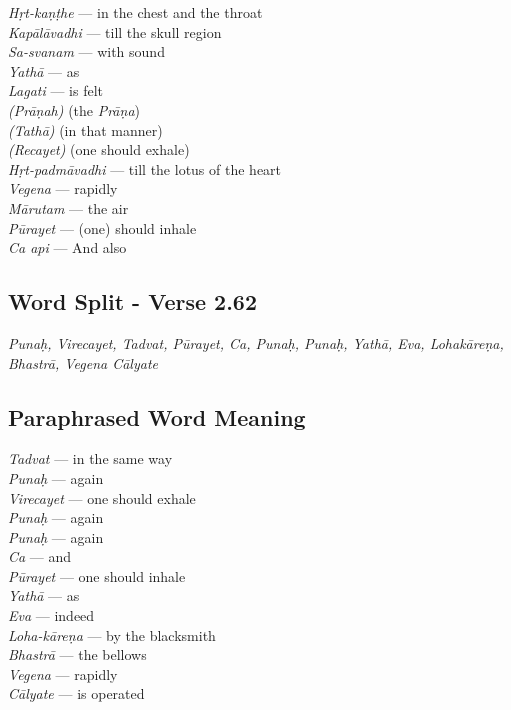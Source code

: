 \begin{multicols}{2}
\textit{Hṛt-kaṇṭhe} --- in the chest and the throat\\
\textit{Kapālāvadhi} --- till the skull  region\\
\textit{Sa-svanam} --- with sound \\
\textit{Yathā} --- as \\
\textit{Lagati} --- is felt \\
\textit{(Prāṇah)}  (the \textit{Prāṇa})\\
\textit{(Tathā)} (in that manner)\\
\textit{(Recayet)} (one should exhale)\\
\textit{Hṛt-padmāvadhi} --- till the lotus of the heart  \\
\textit{Vegena} --- rapidly \\
\textit{Mārutam} --- the air\\ 
\textit{Pūrayet} --- (one) should inhale \\
\textit{Ca api} --- And also 
\end{multicols}

\subsection*{Word Split - Verse 2.62}


\textit{Punaḥ, Virecayet, Tadvat, Pūrayet, Ca, Punaḥ, Punaḥ,  Yathā, Eva, Lohakāreṇa, Bhastrā, Vegena Cālyate}

\subsection*{Paraphrased Word Meaning}


\begin{multicols}{2}
\textit{Tadvat}  --- in the same way\\
\textit{Punaḥ} --- again\\
\textit{Virecayet} --- one should exhale\\
\textit{Punaḥ} --- again\\
\textit{Punaḥ} --- again\\
\textit{Ca} --- and\\
\textit{Pūrayet} --- one should inhale\\
\textit{Yathā} ---  as\\
\textit{Eva} --- indeed \\
\textit{Loha-kāreṇa} --- by the blacksmith\\
\textit{Bhastrā} --- the bellows\\
\textit{Vegena} --- rapidly\\
\textit{Cālyate} --- is operated
\end{multicols}

